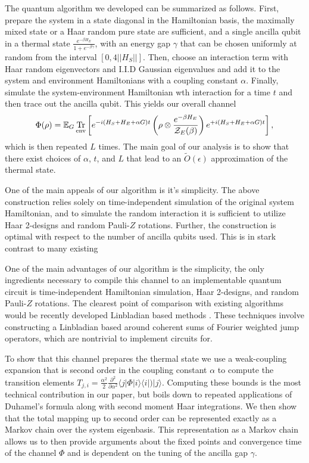 \documentclass[11pt]{article}
\newcommand{\ket}[1]{|#1\rangle}
\newcommand{\bra}[1]{\langle #1|}
\newcommand{\ketbra}[2]{| #1\rangle\! \langle #2|}
\newcommand{\brackets}[1]{\left[ #1 \right]}
\newcommand{\norm}[1]{\left|\left| #1 \right|\right|}
\newcommand{\bigotilde}[1]{\widetilde{O} \left( #1 \right)}
\DeclareMathOperator{\Tr}{Tr}
\newcommand{\partrace}[2]{\Tr_{#1} \brackets{ #2 }}
\newcommand{\partfun}{\mathcal{Z}}
\begin{document}
The quantum algorithm we developed can be summarized as follows. First, prepare the system in a state diagonal in the Hamiltonian basis, the maximally mixed state or a Haar random pure state are sufficient, and a single ancilla qubit in a thermal state $\frac{e^{-\beta H_E}}{1 + e^{-\beta \gamma}}$, with an energy gap $\gamma$ that can be chosen uniformly at random from the interval $[0, 4\norm{H_S}]$. Then, choose an interaction term with Haar random eigenvectors and I.I.D Gaussian eigenvalues and add it to the system and environment Hamiltonians with a coupling constant $\alpha$. Finally, simulate the system-environment Hamiltonian wth interaction for a time $t$ and then trace out the ancilla qubit. This yields our overall channel
\begin{equation}
    \Phi(\rho) = \mathbb{E}_G \partrace{\rm env}{e^{-i(H_S + H_E + \alpha G) t} \left( \rho \otimes \frac{e^{-\beta H_E}}{\partfun_E(\beta)} \right) e^{+i(H_S + H_E + \alpha G) t} },
\end{equation}
which is then repeated $L$ times. The main goal of our analysis is to show that there exist choices of $\alpha$, $t$, and $L$ that lead to an $\bigotilde{\epsilon}$ approximation of the thermal state.

One of the main appeals of our algorithm is it's simplicity. The above construction relies solely on time-independent simulation of the original system Hamiltonian, and to simulate the random interaction it is sufficient to utilize Haar 2-designs and random Pauli-$Z$ rotations. Further, the construction is optimal with respect to the number of ancilla qubits used. This is in stark contrast to many existing 

One of the main advantages of our algorithm is the simplicity, the only ingredients necessary to compile this channel to an implementable quantum circuit is time-independent Hamiltonian simulation, Haar 2-designs, and random Pauli-$Z$ rotations. The clearest point of comparison with existing algorithms would be recently developed Linbladian based methods \cite{chen2023quantumthermalstatepreparation, gilyen2024quantumgeneralizationsglaubermetropolis}. These techniques involve constructing a Linbladian based around coherent sums of Fourier weighted jump operators, which are nontrivial to implement circuits for. 

To show that this channel prepares the thermal state we use a weak-coupling expansion that is second order in the coupling constant $\alpha$ to compute the transition elements $T_{j, i} =  \frac{\alpha^2}{2} \frac{\partial^2}{\partial \alpha^2}\bra{j} \Phi\ketbra{i}{i}) \ket{j}$. Computing these bounds is the most technical contribution in our paper, but boils down to repeated applications of Duhamel's formula along with second moment Haar integrations. We then show that the total mapping up to second order can be represented exactly as a Markov chain over the system eigenbasis. This representation as a Markov chain allows us to then provide arguments about the fixed points and convergence time of the channel $\Phi$ and is dependent on the tuning of the ancilla gap $\gamma$.
\end{document}
